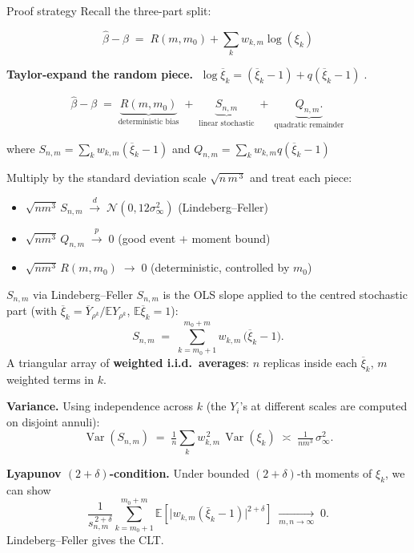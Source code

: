 \documentclass[10pt, aspectratio=169, xcolor={table}]{beamer}
\newcommand{\E}{\mathbb{E}}
\newcommand{\Var}{\operatorname{Var}}
\begin{document}
\begin{frame}{Proof strategy}
  Recall the three-part split:

  \[
  \hat \beta - \beta \; =\;
  R(m,m_0) + \sum_k w_{k,m} \log(\xi_k)
  \]

  \vspace{0.3em}
  \textbf{Taylor-expand the random piece.} 
  $\;\log \overline{\xi}_k = (\overline{\xi}_k - 1) + q(\overline{\xi}_k - 1)\;$.

  
  \[
    \hat\beta - \beta \;=\;
        \underbrace{R(m, m_0)}_{\text{deterministic bias}}
        \;+\;
        \underbrace{S_{n,m}}_{\text{linear stochastic}}
        \;+\;
        \underbrace{Q_{n,m}.}_{\text{quadratic remainder}}\, 
  \]

  where $S_{n,m} = \sum_k w_{k,m}(\overline{\xi}_k - 1) $ and $Q_{n,m} = \sum_k w_{k,m} q(\overline{\xi}_k - 1)$

  \vspace{0.4em}
  Multiply by the standard deviation scale $\sqrt{n\, m^{\,3}}$ and treat each piece:
  \begin{itemize}
    \item $\sqrt{n m^3}\, S_{n,m}\;\xrightarrow{\,d\,}\;\mathcal N(0,
          12\sigma_\infty^2)$ \quad (Lindeberg--Feller)
    \item $\sqrt{n m^3}\, Q_{n,m}\;\xrightarrow{\,p\,}\; 0$
          \quad (good event $+$ moment bound)
    \item $\sqrt{n m^3}\, R(m,m_0)\;\to\; 0$
          \quad (deterministic, controlled by $m_0$)
  \end{itemize}

\end{frame}

\begin{frame}{$S_{n,m}$ via Lindeberg--Feller}
  $S_{n,m}$ is the OLS slope applied to the centred stochastic part
  (with $\overline{\xi}_k = \overline Y_{\rho^k}/\E Y_{\rho^k}$, $\E\overline{\xi}_k = 1$):
  \[
    S_{n,m} \;=\; \sum_{k = m_0+1}^{m_0+m} w_{k,m}\,
        \bigl(\overline{\xi}_k - 1\bigr).
  \]
  A triangular array of \textbf{weighted i.i.d.\ averages}:
  $n$ replicas inside each $\overline{\xi}_k$, $m$ weighted terms in $k$.

  \vspace{0.4em}
  \textbf{Variance.} Using independence across $k$ (the $Y_i$'s at
  different scales are computed on disjoint annuli):
  \[
    \Var(S_{n,m}) \;=\; \tfrac{1}{n}
        \sum_{k} w_{k,m}^{\,2}\, \Var(\xi_k)
        \;\asymp\; \tfrac{1}{n m^3}\, \sigma_\infty^2.
  \]

  \vspace{0.2em}
  \textbf{Lyapunov $(2+\delta)$-condition.} Under bounded
  $(2+\delta)$-th moments of $\xi_k$,
  we can show
  \[
    \frac{1}{s_{n,m}^{\,2+\delta}}\sum_{k=m_0+1}^{m_0+m}
          \E\!\left[\bigl|w_{k,m}(\bar{\xi}_{k}-1)\bigr|^{2+\delta}\right]
    \;\xrightarrow[m,n\to\infty]{}\; 0.
  \]
  Lindeberg--Feller gives the CLT.
\end{frame}
\end{document}
